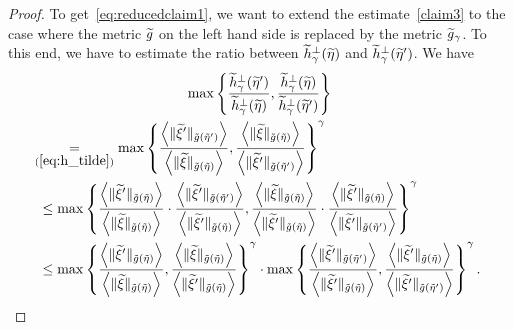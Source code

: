 \documentclass[AHL,Unicode,longabstracts,published]{cedram}
\newcommand*\eq[1]{\underset{(#1)}{=}}
\let\oldtilde\tilde
\renewcommand*{\tilde}[1]{\mathchoice{\widetilde{#1}}{\widetilde{#1}}{\oldtilde{#1}}{\oldtilde{#1}}}
\begin{document}
\begin{proof}
To get~\eqref{eq:reducedclaim1}, we want to extend the estimate~\eqref{claim3} to the case where the metric $\tilde{g}$ on the left hand side is replaced by the metric $\tilde{g}_{\gamma}$. To this end, we have to estimate the ratio between $\tilde{h}_{\gamma}^{\perp}(\tilde{\eta})$ and $\tilde{h}_{\gamma}^{\perp}(\tilde{\eta}')$. We have
\begin{multline}\label{eq:vg}
\max  \left\{ \frac{\tilde{h}_{\gamma}^{\perp}(\tilde{\eta}')}{\tilde{h}_{\gamma}^{\perp}(\tilde{\eta})},\frac{\tilde{h}_{\gamma}^{\perp}(\tilde{\eta})}{\tilde{h}_{\gamma}^{\perp}(\tilde{\eta}')}\right\}\\
\begin{aligned}
&\mkern-10mu\eq{\ref{eq:h_tilde}}\max\left\{ \frac{\left\langle\|\tilde{\xi}'\|_{\tilde{g}\left(\tilde{\eta}'\right)}\right\rangle}{\left\langle\|\tilde{\xi}\|_{\tilde{g}\left(\tilde{\eta}\right)}\right\rangle},\frac{\left\langle\|\tilde{\xi}\|_{\tilde{g}\left(\tilde{\eta}\right)}\right\rangle}{\left\langle\|\tilde{\xi}'\|_{\tilde{g}\left(\tilde{\eta}'\right)}\right\rangle}\right\} ^{\gamma}\\
& \le\max\left\{ \frac{\left\langle\|\tilde{\xi}'\|_{\tilde{g}\left(\tilde{\eta}\right)}\right\rangle}{\left\langle\|\tilde{\xi}\|_{\tilde{g}\left(\tilde{\eta}\right)}\right\rangle}\cdot\frac{\left\langle\|\tilde{\xi}'\|_{\tilde{g}\left(\tilde{\eta}'\right)}\right\rangle}{\left\langle\|\tilde{\xi}'\|_{\tilde{g}\left(\tilde{\eta}\right)}\right\rangle},\frac{\left\langle\|\tilde{\xi}\|_{\tilde{g}\left(\tilde{\eta}\right)}\right\rangle}{\left\langle\|\tilde{\xi}'\|_{\tilde{g}\left(\tilde{\eta}\right)}\right\rangle}\cdot\frac{\left\langle\|\tilde{\xi}'\|_{\tilde{g}\left(\tilde{\eta}\right)}\right\rangle}{\left\langle\|\tilde{\xi}'\|_{\tilde{g}\left(\tilde{\eta}'\right)}\right\rangle}\right\} ^{\gamma}\\
& \le\max\left\{ \frac{\left\langle\|\tilde{\xi}'\|_{\tilde{g}\left(\tilde{\eta}\right)}\right\rangle}{\left\langle\|\tilde{\xi}\|_{\tilde{g}\left(\tilde{\eta}\right)}\right\rangle},\frac{\left\langle\|\tilde{\xi}\|_{\tilde{g}\left(\tilde{\eta}\right)}\right\rangle}{\left\langle\|\tilde{\xi}'\|_{\tilde{g}\left(\tilde{\eta}\right)}\right\rangle}\right\}^{\gamma}\cdot\max\left\{ \frac{\left\langle\|\tilde{\xi}'\|_{\tilde{g}\left(\tilde{\eta}'\right)}\right\rangle}{\left\langle\|\tilde{\xi}'\|_{\tilde{g}\left(\tilde{\eta}\right)}\right\rangle},\frac{\left\langle\|\tilde{\xi}'\|_{\tilde{g}\left(\tilde{\eta}\right)}\right\rangle}{\left\langle\|\tilde{\xi}'\|_{\tilde{g}\left(\tilde{\eta}'\right)}\right\rangle}\right\} ^{\gamma}.

\end{aligned}
\end{multline}
\end{proof}
\end{document}
